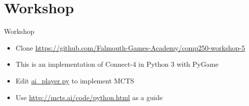 \part{Workshop}
\frame{\partpage}

\begin{frame}{Workshop}
    \begin{itemize}
        \item Clone \url{https://github.com/Falmouth-Games-Academy/comp250-workshop-5}
        \item This is an implementation of Connect-4 in Python 3 with PyGame
        \item Edit \url{ai_player.py} to implement MCTS
        \item Use \url{http://mcts.ai/code/python.html} as a guide
    \end{itemize}
\end{frame}